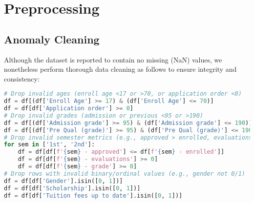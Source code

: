 \documentclass[twoside,final]{hcmut-report}
\begin{document}
\section{Preprocessing}
\subsection*{Anomaly Cleaning}
Although the dataset is reported to contain no missing (NaN) values, we nonetheless perform thorough data cleaning as follows to ensure integrity and consistency:
\begin{lstlisting}[language=python]
# Drop invalid ages (enroll age <17 or >70, or application order <0)
df = df[(df['Enroll Age'] >= 17) & (df['Enroll Age'] <= 70)]
df = df[df['Application order'] >= 0]
# Drop invalid grades (admission or previous <95 or >190)
df = df[(df['Admission grade'] >= 95) & (df['Admission grade'] <= 190)]
df = df[(df['Pre Qual (grade)'] >= 95) & (df['Pre Qual (grade)'] <= 190)]
# Drop invalid semester metrics (e.g., approved > enrolled, evaluations <0)
for sem in ['1st', '2nd']:
    df = df[df[f'{sem} - approved'] <= df[f'{sem} - enrolled']]
    df = df[df[f'{sem} - evaluations'] >= 0]
    df = df[df[f'{sem} - grade'] >= 0]
# Drop rows with invalid binary/ordinal values (e.g., gender not 0/1)
df = df[df['Gender'].isin([0, 1])]
df = df[df['Scholarship'].isin([0, 1])]
df = df[df['Tuition fees up to date'].isin([0, 1])]
\end{lstlisting}
\end{document}
